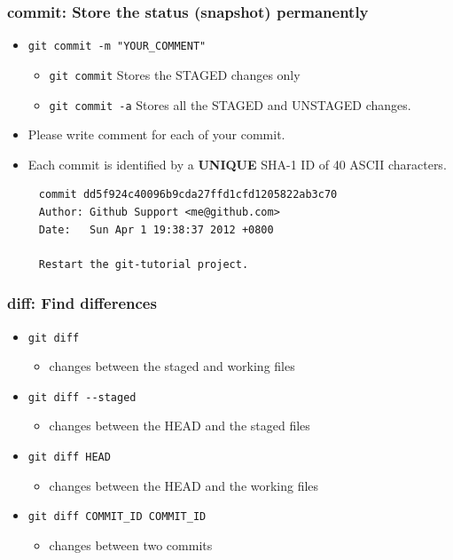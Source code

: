 \documentclass[11pt,ignorenonframetext,]{beamer}
\begin{document}
\begin{frame}[fragile, label=gitcommit]\frametitle{commit: Store the status (snapshot)
permanently}

\begin{itemize}
\item
  \texttt{git commit -m "YOUR\_COMMENT"}
  \begin{itemize}
  \item
    \texttt{git commit} Stores the STAGED changes only
  \item
    \texttt{git commit -a} Stores all the STAGED and UNSTAGED changes.
  \end{itemize}
\item
  Please write comment for each of your commit.
\item
  Each commit is identified by a \textbf{UNIQUE} SHA-1 ID of 40 ASCII
  characters.
\end{itemize}

{\small
\begin{verbatim}
     commit dd5f924c40096b9cda27ffd1cfd1205822ab3c70
     Author: Github Support <me@github.com>
     Date:   Sun Apr 1 19:38:37 2012 +0800

     Restart the git-tutorial project.
\end{verbatim}
}

\end{frame}

\begin{frame}[fragile, label=gitdiff]\frametitle{diff: Find differences}

\begin{itemize}
\item
  \texttt{git diff}
  \begin{itemize}
  \item
    changes between the staged and working files
  \end{itemize}
\item
  \texttt{git diff -{}-staged}
  \begin{itemize}
  \item
    changes between the HEAD and the staged files
  \end{itemize}
\item
  \texttt{git diff HEAD}
  \begin{itemize}
  \item
    changes between the HEAD and the working files
  \end{itemize}
\item
  \texttt{git diff COMMIT\_ID COMMIT\_ID}
  \begin{itemize}
  \item
    changes between two commits
  \end{itemize}
\end{itemize}
\end{frame}
\end{document}
